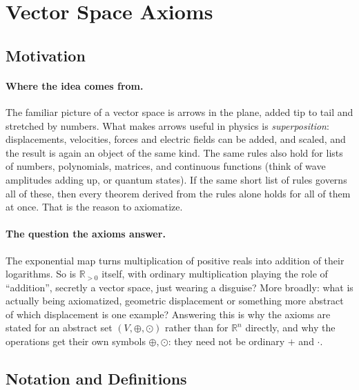 \documentclass[11pt]{article}
\newcommand{\Vsp}{(V, \oplus, \odot)}
\begin{document}
\section{Vector Space Axioms}

\subsection*{Motivation}

\paragraph{Where the idea comes from.}
The familiar picture of a vector space is arrows in the plane, added tip to tail and stretched by numbers. What makes arrows useful in physics is \emph{superposition}: displacements, velocities, forces and electric fields can be added, and scaled, and the result is again an object of the same kind. The same rules also hold for lists of numbers, polynomials, matrices, and continuous functions (think of wave amplitudes adding up, or quantum states). If the same short list of rules governs all of these, then every theorem derived from the rules alone holds for all of them at once. That is the reason to axiomatize.

\paragraph{The question the axioms answer.}
The exponential map turns multiplication of positive reals into addition of their logarithms. So is $\mathbb{R}_{>0}$ itself, with ordinary multiplication playing the role of ``addition'', secretly a vector space, just wearing a disguise? More broadly: what is actually being axiomatized, geometric displacement or something more abstract of which displacement is one example? Answering this is why the axioms are stated for an abstract set $\Vsp$ rather than for $\mathbb{R}^n$ directly, and why the operations get their own symbols $\oplus,\odot$: they need not be ordinary $+$ and $\cdot$.

\subsection*{Notation and Definitions}
\end{document}

